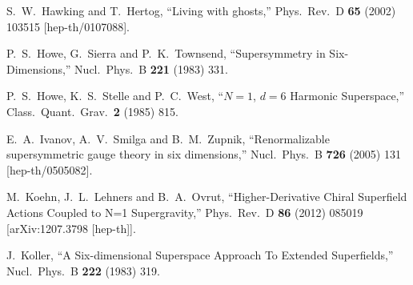 \begin{thebibliography}{99}
  
  
  





  S.~W.~Hawking and T.~Hertog,
  ``Living with ghosts,''
  Phys.\ Rev.\ D {\bf 65} (2002) 103515
  [hep-th/0107088].
  
  
  P.~S.~Howe, G.~Sierra and P.~K.~Townsend,
  ``Supersymmetry in Six-Dimensions,''
  Nucl.\ Phys.\ B {\bf 221} (1983) 331.
  
  
  P.~S.~Howe, K.~S.~Stelle and P.~C.~West,
  ``$N=1$, $d = 6$ Harmonic Superspace,''
  Class.\ Quant.\ Grav.\  {\bf 2} (1985) 815.



  E.~A.~Ivanov, A.~V.~Smilga and B.~M.~Zupnik,
  ``Renormalizable supersymmetric gauge theory in six dimensions,''
  Nucl.\ Phys.\ B {\bf 726} (2005) 131
  [hep-th/0505082].


  
  M.~Koehn, J.~L.~Lehners and B.~A.~Ovrut,
  ``Higher-Derivative Chiral Superfield Actions Coupled to N=1 Supergravity,''
  Phys.\ Rev.\ D {\bf 86} (2012) 085019
  [arXiv:1207.3798 [hep-th]].



  

  J.~Koller,
  ``A Six-dimensional Superspace Approach To Extended Superfields,''
  Nucl.\ Phys.\ B {\bf 222} (1983) 319.
  

\end{thebibliography}
